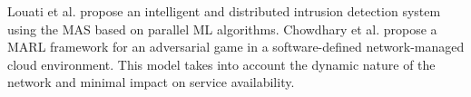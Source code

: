 \documentclass[acmsmall]{acmart}
\begin{document}
Louati et al. \cite{louati2022distributed} propose an intelligent and distributed intrusion detection system using the MAS based on parallel ML algorithms.
Chowdhary et al. \cite{chowdhary2021sdn} propose a MARL framework for an adversarial game in a software-defined network-managed cloud environment. This model takes into account the dynamic nature of the network and minimal impact on service availability.
\end{document}
